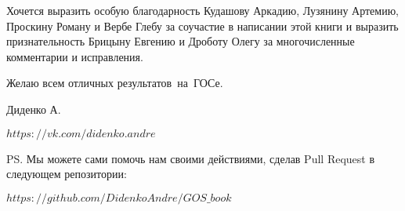 Хочется выразить особую благодарность Кудашову Аркадию, Лузянину Артемию, Проскину Роману и Вербе Глебу за соучастие в написании этой книги и выразить признательность Брицыну Евгению и Дроботу Олегу за многочисленные комментарии и исправления.
 
\vspace*{\baselineskip}

Желаю всем отличных результатов~на~ГОСе.

\mbox{}

\noindent Диденко А. 

\noindent\href{https://vk.com/didenko.andre}{$https://vk.com/didenko.andre$}

\mbox{}

\noindent PS. Мы можете сами помочь нам своими действиями, сделав Pull Request в следующем репозитории:

\noindent\href{https://github.com/DidenkoAndre/GOS_book}{$https://github.com/DidenkoAndre/GOS\_book$}